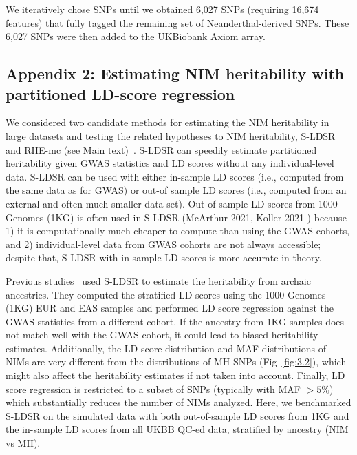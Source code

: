 We iteratively chose SNPs until we obtained 6,027 SNPs (requiring 16,674 features) that fully tagged the remaining set of Neanderthal-derived SNPs. These 6,027 SNPs were then added to the UKBiobank Axiom array.

\subsection{Appendix 2: Estimating NIM heritability with partitioned LD-score regression}
\label{asec:2}
We considered two candidate methods for estimating the NIM heritability in large datasets and testing the related hypotheses to NIM heritability, S-LDSR~\cite{finucane2015partitioning}  and RHE-mc (see Main text)~\cite{pazokitoroudi2020efficient}. S-LDSR can speedily estimate partitioned heritability given GWAS statistics and LD scores without any individual-level data. S-LDSR can be used with either in-sample LD scores (i.e., computed from the same data as for GWAS) or out-of sample LD scores (i.e., computed from an external and often much smaller data set). Out-of-sample LD scores from 1000 Genomes (1KG) is often used in S-LDSR (McArthur 2021, Koller 2021 ) because 1) it is computationally much cheaper to compute than using the GWAS cohorts, and 2) individual-level data from GWAS cohorts are not always accessible; despite that, S-LDSR with in-sample LD scores is more accurate in theory. 

Previous studies~\cite{mcarthur2021quantifying} used S-LDSR to estimate the heritability from archaic ancestries. They computed the stratified LD scores using the 1000 Genomes (1KG) EUR and EAS samples and performed LD score regression against the GWAS statistics from a different cohort. If the ancestry from 1KG samples does not match well with the GWAS cohort, it could lead to biased heritability estimates. Additionally, the LD score distribution and MAF distributions of NIMs are very different from the distributions of MH SNPs (Fig~\ref{fig:3.2}), which might also affect the heritability estimates if not taken into account. Finally, LD score regression is restricted to a subset of SNPs (typically with MAF $> 5\%$) which substantially reduces the number of NIMs analyzed. Here, we benchmarked S-LDSR on the simulated data with both out-of-sample LD scores from 1KG and the in-sample LD scores from all UKBB QC-ed data, stratified by ancestry (NIM vs MH). 

